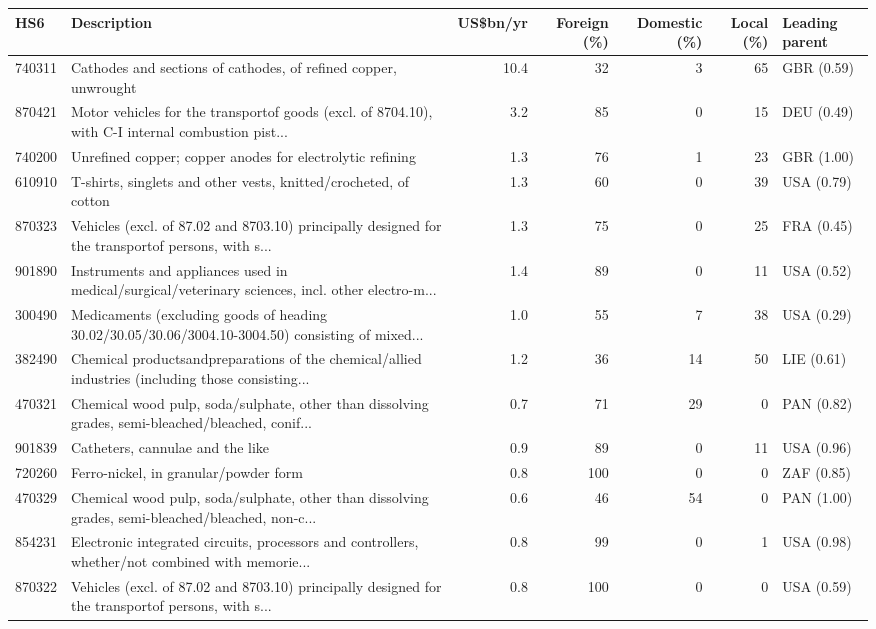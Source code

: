 \begin{tabular}{@{}l p{6.4cm} r r r r l@{}}
\toprule
HS6 & Description & US\$bn/yr & Foreign (\%) & Domestic (\%) & Local (\%) & Leading parent \\
\midrule
740311 & Cathodes and sections of cathodes, of refined copper, unwrought & 10.4 & 32 & 3 & 65 & GBR (0.59) \\
870421 & Motor vehicles for the transportof goods (excl. of 8704.10), with C-I internal combustion pist... & 3.2 & 85 & 0 & 15 & DEU (0.49) \\
740200 & Unrefined copper; copper anodes for electrolytic refining & 1.3 & 76 & 1 & 23 & GBR (1.00) \\
610910 & T-shirts, singlets and other vests, knitted/\allowbreak{}crocheted, of cotton & 1.3 & 60 & 0 & 39 & USA (0.79) \\
870323 & Vehicles (excl. of 87.02 and 8703.10) principally designed for the transportof persons, with s... & 1.3 & 75 & 0 & 25 & FRA (0.45) \\
901890 & Instruments and appliances used in medical/\allowbreak{}surgical/\allowbreak{}veterinary sciences, incl. other electro-m... & 1.4 & 89 & 0 & 11 & USA (0.52) \\
300490 & Medicaments (excluding goods of heading 30.02/\allowbreak{}30.05/\allowbreak{}30.06/\allowbreak{}3004.10-3004.50) consisting of mixed... & 1.0 & 55 & 7 & 38 & USA (0.29) \\
382490 & Chemical productsandpreparations of the chemical/\allowbreak{}allied industries (including those consisting... & 1.2 & 36 & 14 & 50 & LIE (0.61) \\
470321 & Chemical wood pulp, soda/\allowbreak{}sulphate, other than dissolving grades, semi-bleached/\allowbreak{}bleached, conif... & 0.7 & 71 & 29 & 0 & PAN (0.82) \\
901839 & Catheters, cannulae and the like & 0.9 & 89 & 0 & 11 & USA (0.96) \\
720260 & Ferro-nickel, in granular/\allowbreak{}powder form & 0.8 & 100 & 0 & 0 & ZAF (0.85) \\
470329 & Chemical wood pulp, soda/\allowbreak{}sulphate, other than dissolving grades, semi-bleached/\allowbreak{}bleached, non-c... & 0.6 & 46 & 54 & 0 & PAN (1.00) \\
854231 & Electronic integrated  circuits, processors and controllers, whether/\allowbreak{}not combined with memorie... & 0.8 & 99 & 0 & 1 & USA (0.98) \\
870322 & Vehicles (excl. of 87.02 and 8703.10) principally designed for the transportof persons, with s... & 0.8 & 100 & 0 & 0 & USA (0.59) \\

\end{tabular}
